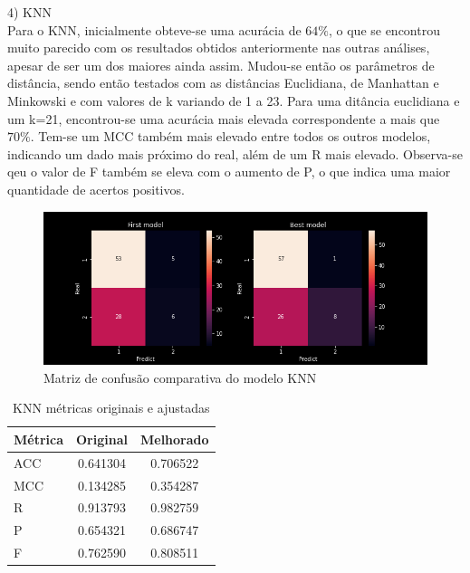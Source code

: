 \noindent \textcolor{deepblue}{4) KNN}
\\

Para o KNN, inicialmente obteve-se uma acurácia de $64\%$, o que se encontrou muito parecido com os resultados obtidos anteriormente nas outras análises, apesar de ser um dos maiores ainda assim. Mudou-se então os parâmetros de distância, sendo então testados com as distâncias Euclidiana, de Manhattan e Minkowski e com valores de k variando de 1 a 23. Para uma ditância euclidiana e um k=21, encontrou-se uma acurácia mais elevada correspondente a mais que $70\%$. Tem-se um MCC também mais elevado entre todos os outros modelos, indicando um dado mais próximo do real, além de um R mais elevado. Observa-se qeu o valor de F também se eleva com o aumento de P, o que indica uma maior quantidade de acertos positivos.

\begin{figure}[H]
    \centering
    \includegraphics[width=\linewidth, scale=.6]{../../figuras/machine_learning/KNN_MC.png}
    \caption{Matriz de confusão comparativa do modelo KNN}
\end{figure}

\begin{table}[ht]
    \centering
    \begin{tabular}{lcc}
        \rowcolor{pagecolor!50!COLOR1}
        \hline
        Métrica & Original & Melhorado \\\hline\hline
        ACC     & 0.641304 & 0.706522  \\\hline
        MCC     & 0.134285 & 0.354287  \\\hline
        R       & 0.913793 & 0.982759  \\\hline
        P       & 0.654321 & 0.686747  \\\hline
        F       & 0.762590 & 0.808511
    \end{tabular}
    \caption{KNN métricas originais e ajustadas}
\end{table}

